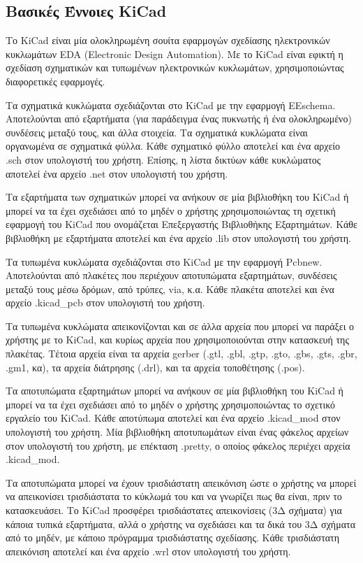 \documentclass[a4paper]{article}
\begin{document}
\subsection{Βασικές Έννοιες KiCad}
Το \textenglish{KiCad} είναι μία ολοκληρωμένη σουίτα εφαρμογών σχεδίασης ηλεκτρονικών κυκλωμάτων \textenglish{EDA (Electronic Design Automation)}. Με το \textenglish{KiCad} είναι εφικτή η σχεδίαση σχηματικών και τυπωμένων ηλεκτρονικών κυκλωμάτων, χρησιμοποιώντας διαφορετικές εφαρμογές.

Τα σχηματικά κυκλώματα σχεδιάζονται στο \textenglish{KiCad} με την εφαρμογή \textenglish{EEschema}. Αποτελούνται από εξαρτήματα (για παράδειγμα ένας πυκνωτής ή ένα ολοκληρωμένο) συνδέσεις μεταξύ τους, και άλλα στοιχεία. Τα σχηματικά κυκλώματα είναι οργανωμένα σε σχηματικά φύλλα. Κάθε σχηματικό φύλλο αποτελεί και ένα αρχείο .sch στον υπολογιστή του χρήστη. Επίσης, η λίστα δικτύων κάθε κυκλώματος αποτελεί ένα αρχείο .net στον υπολογιστή του χρήστη.

Τα εξαρτήματα των σχηματικών μπορεί να ανήκουν σε μία βιβλιοθήκη του \textenglish{KiCad} ή μπορεί να τα έχει σχεδιάσει από το μηδέν ο χρήστης χρησιμοποιώντας τη σχετική εφαρμογή του \textenglish{KiCad} που ονομάζεται Επεξεργαστής Βιβλιοθήκης Εξαρτημάτων. Κάθε βιβλιοθήκη με εξαρτήματα αποτελεί και ένα αρχείο .lib στον υπολογιστή του χρήστη.

Τα τυπωμένα κυκλώματα σχεδιάζονται στο \textenglish{KiCad} με την εφαρμογή Pcbnew. Αποτελούνται από πλακέτες που περιέχουν αποτυπώματα εξαρτημάτων, συνδέσεις μεταξύ τους μέσω δρόμων, από τρύπες, via, κ.α.
Κάθε πλακέτα αποτελεί και ένα αρχείο .kicad\_pcb στον υπολογιστή του χρήστη. 

Τα τυπωμένα κυκλώματα απεικονίζονται και σε άλλα αρχεία που μπορεί να παράξει ο χρήστης με το \textenglish{KiCad}, και κυρίως αρχεία που χρησιμοποιούνται στην κατασκευή της πλακέτας. Τέτοια αρχεία είναι τα αρχεία gerber (.gtl, .gbl, .gtp, .gto, .gbs, .gts, .gbr, .gm1, κα), τα αρχεία διάτρησης (.drl), και τα αρχεία τοποθέτησης (.pos).

Τα αποτυπώματα εξαρτημάτων μπορεί να ανήκουν σε μία βιβλιοθήκη του \textenglish{KiCad} ή μπορεί να τα έχει σχεδιάσει από το μηδέν ο χρήστης χρησιμοποιώντας το σχετικό εργαλείο του \textenglish{KiCad}. Κάθε αποτύπωμα αποτελεί και ένα αρχείο .kicad\_mod στον υπολογιστή του χρήστη. Μία βιβλιοθήκη αποτυπωμάτων είναι ένας φάκελος αρχείων στον υπολογιστή του χρήστη, με επέκταση .pretty, ο οποίος φάκελος περιέχει αρχεία .kicad\_mod.

Τα αποτυπώματα μπορεί να έχουν τρισδιάστατη απεικόνιση ώστε ο χρήστης να μπορεί να απεικονίσει τρισδιάστατα το κύκλωμά του και να γνωρίζει πως θα είναι, πριν το κατασκευάσει. Το \textenglish{KiCad} προσφέρει τρισδιάστατες απεικονίσεις (3Δ σχήματα) για κάποια τυπικά εξαρτήματα, αλλά ο χρήστης να σχεδιάσει και τα δικά του 3Δ σχήματα από το μηδέν, με κάποιο πρόγραμμα τρισδιάστατης σχεδίασης. Κάθε τρισδιάστατη απεικόνιση αποτελεί και ένα αρχείο .wrl στον υπολογιστή του χρήστη. 
\end{document}

